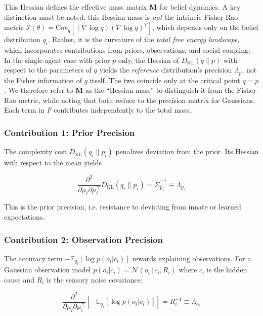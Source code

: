 \documentclass[12pt]{article}
\begin{document}
This Hessian defines the effective mass matrix $\mathbf{M}$ for belief dynamics. A key distinction must be noted: this Hessian mass is \emph{not} the intrinsic Fisher-Rao metric $\mathcal{I}(\theta) = \mathrm{Cov}_{q}[(\nabla \log q)(\nabla \log q)^T]$, which depends only on the belief distribution $q_i$. Rather, it is the curvature of the \emph{total free energy landscape}, which incorporates contributions from priors, observations, and social coupling. In the single-agent case with prior $p$ only, the Hessian of $D_{\mathrm{KL}}(q \| p)$ with respect to the parameters of $q$ yields the \emph{reference} distribution's precision $\Lambda_p$, not the Fisher information of $q$ itself. The two coincide only at the critical point $q = p$. We therefore refer to $\mathbf{M}$ as the ``Hessian mass'' to distinguish it from the Fisher-Rao metric, while noting that both reduce to the precision matrix for Gaussians. Each term in $F$ contributes independently to the total mass.

\subsubsection{Contribution 1: Prior Precision}

The complexity cost $D_{\mathrm{KL}}(q_i \| p_i)$ penalizes deviation from the prior. Its Hessian with respect to the mean yields

\begin{equation}
\frac{\partial^2}{\partial\mu_i\partial\mu_i^\top} D_{\mathrm{KL}}(q_i \| p_i) = \bar{\Sigma}_{p_i}^{-1} \equiv \bar{\Lambda}_{p_i}
\end{equation}

This is the prior precision, i.e. resistance to deviating from innate or learned expectations.

\subsubsection{Contribution 2: Observation Precision}

The accuracy term $-\mathbb{E}_{q_i}[\log p(o_i|c_i)]$ rewards explaining observations. For a Gaussian observation model $p(o_i|c_i) = \mathcal{N}(o_i \,|\, c_i, R_i)$ where $c_i$ is the hidden cause and $R_i$ is the sensory noise covariance:

\begin{equation}
\frac{\partial^2}{\partial\mu_i\partial\mu_i^\top} \left[-\mathbb{E}_{q_i}[\log p(o_i|c_i)]\right] = R_i^{-1} \equiv \Lambda_{o_i}
\end{equation}
\end{document}
